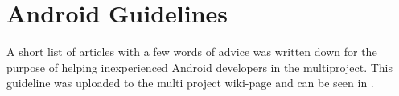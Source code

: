 
\section{Android Guidelines}

A short list of articles with a few words of advice was written down for the purpose of helping inexperienced Android developers in the multiproject. This guideline was uploaded to the multi project wiki-page and can be seen in .